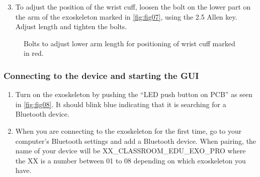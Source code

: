 \begin{enumerate}[]
	\setcounter{enumi}{2}
	\item To adjust the position of the wrist cuff, loosen the bolt on the lower part on the arm of the exoskeleton marked in \autoref{fig:fig07}, using the 2.5 Allen key. Adjust length and tighten the bolts.
\end{enumerate} 

\begin{figure}[H]
	\centering
	\begin{center}
	\end{center}
	\caption{Bolts to adjust lower arm length for positioning of wrist cuff marked in red.}
	\label{fig:fig07}
\end{figure}
\subsubsection{Connecting to the device and starting the GUI}
\begin{enumerate}[]
	\item Turn on the exoskeleton by pushing the “LED push button on PCB” as seen in \autoref{fig:fig08}. It  should blink blue indicating that it is searching for a Bluetooth device.
	\item When you are connecting to the exoskeleton for the first time, go to your computer's Bluetooth settings and add a Bluetooth device. When pairing, the name of your device will be XX\_CLASSROOM\_EDU\_EXO\_PRO where the XX is a number between 01 to 08 depending on which exoskeleton you have.
\end{enumerate}

